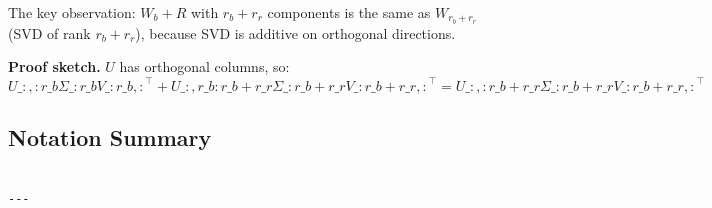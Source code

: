 The key observation: $W_b + R$ with $r_b + r_r$ components is the same as 
$W_{r_b + r_r}$ (SVD of rank $r_b + r_r$), because SVD is additive on 
orthogonal directions.

\textbf{Proof sketch.} $U$ has orthogonal columns, so:
\[
U\_{:, :r\_b} \Sigma\_{:r\_b} V\_{:r\_b, :}^\top + U\_{:, r\_b:r\_b+r\_r} \Sigma\_{:r\_b+r\_r} V\_{:r\_b+r\_r, :}^\top = U\_{:, :r\_b+r\_r} \Sigma\_{:r\_b+r\_r} V\_{:r\_b+r\_r, :}^\top
\tag{3.5}
\]

\subsection{Notation Summary}

\begin{lstlisting}

---
\end{lstlisting}